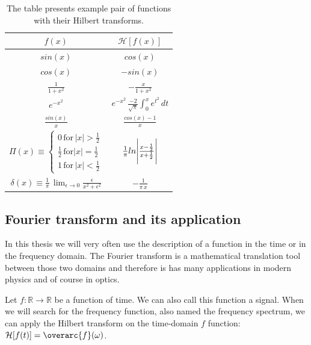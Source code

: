 \documentclass[12pt,twoside,a4paper]{article}
\numberwithin{equation}{subsection}
\numberwithin{figure}{subsection}
\begin{document}
\begin{table} 
  \centering
  \begin{tabular}{c | c}
    \hline \hline    
      $ f(x) $             & $ \mathcal{H}[f(x)] $ \\ 
    \hline \hline 
      $ sin(x) $           & $ cos(x) $ \\ 
    \hline
      $ cos(x) $           & $ - sin(x) $ \\ 
    \hline
      $ \frac{1}{1+x^2} $  & $ - \frac{x}{1 + x^2} $ \\ 
    \hline
      $ e^{-x^2} $         & $ e^{-x^2} \, \frac{ - 2 }{\sqrt{\pi}} \int_{0}^{x} e^{t^2} \, dt$ \\ 
    \hline
      $ \frac{sin(x)}{x} $ & $ \frac{cos(x)-1}{x} $ \\ 
    \hline
      $ \Pi(x) \equiv %
      \begin{cases} 
       0 \, \text{for}\, |x| > \frac{1}{2} \\
       \frac{1}{2}\, \text{for} |x| = \frac{1}{2} \\
       1\, \text{for}\, |x| < \frac{1}{2}
      \end{cases}        $ & $ \frac{1}{\pi} ln \Bigg{|} \frac{x - \frac{1}{2}}{x + \frac{1}{2}} \Bigg{|}  $ \\ 
    \hline
      $ \delta(x) \equiv \frac{1}{\pi} \, \lim_{\epsilon \to 0} \frac{\epsilon}{x ^ 2 + \epsilon ^ 2} 
                         $ & $ - \frac{1}{\pi \, x} $ \\
    \hline  
  \end{tabular} 
  \caption{The table presents example pair of functions with their Hilbert transforms.}
  \label{tab:mathematical_hexample}
\end{table}

\subsection{Fourier transform and its application}
 
In this thesis we will very often use the description of a function in the time or in the frequency domain. The Fourier transform is a
mathematical translation tool between those two domains and therefore is has many applications in modern physics and of course in optics.

Let $f : \mathbb{R} \to \mathbb{R} $ be a function of time. We can also call this function a signal. When we will search for the frequency
function, also named the frequency spectrum, we can apply the Hilbert transform on the time-domain $ f $ function: $ \mathcal{H}[f(t)] = 
\overarc{f}(\omega) $.
\end{document}
